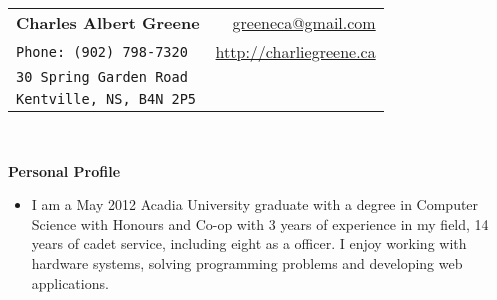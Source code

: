 \documentclass[letterpaper,11pt]{article}
\newcommand{\resheading}[1]{{\large \colorbox{mygrey}{\begin{minipage}{\textwidth}{\textbf{#1 \vphantom{p\^{E}} }}\end{minipage}} }}
\begin{document}
\newcommand{\mywebheader}{
\begin{tabular*}{7in}{l@{\extracolsep{\fill}}r}
    \textbf{\LARGE Charles Albert Greene} & \href{mailto:greeneca@gmail.com}{greeneca@gmail.com}\\
    {\footnotesize \texttt{Phone: (902) 798-7320}} & {\href{http://charliegreene.ca}{http://charliegreene.ca}} \\
    {\footnotesize \texttt{30 Spring Garden Road}}\\
    {\footnotesize \texttt{Kentville, NS, B4N 2P5}}\\
    \end{tabular*}
\\
\vspace{0.1in}}


\mywebheader


\resheading{Personal Profile} %
    \begin{itemize}
        \item[] I am a May 2012 Acadia University graduate with a degree in Computer Science with Honours and Co-op with 3
        years of experience in my field, 14 years of cadet service, including eight as a officer. I enjoy working with hardware systems,
        solving programming problems and developing web applications.
    \end{itemize}
\end{document}
